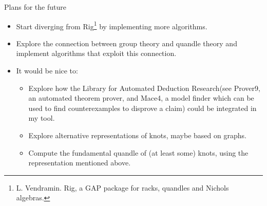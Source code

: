 \begin{frame}{Plans for the future}


\begin{itemize}
    \item Start diverging from Rig\footnote{L. Vendramin. Rig, a GAP package for racks, quandles and Nichols algebras.} by implementing more algorithms. 
    \item Explore the connection between group theory and quandle theory and implement algorithms that exploit this connection. 
    \item It would be nice to:
    \begin{itemize}
        \item Explore how the Library for Automated Deduction Research(see Prover9, an automated theorem prover, and Mace4, a model finder which can be used to find counterexamples to disprove a claim) could be integrated in my tool. 
        \item Explore alternative representations of knots, maybe based on graphs.
        \item Compute the fundamental quandle of (at least some) knots, using the representation mentioned above.
        
    \end{itemize}
    
\end{itemize}

\end{frame}